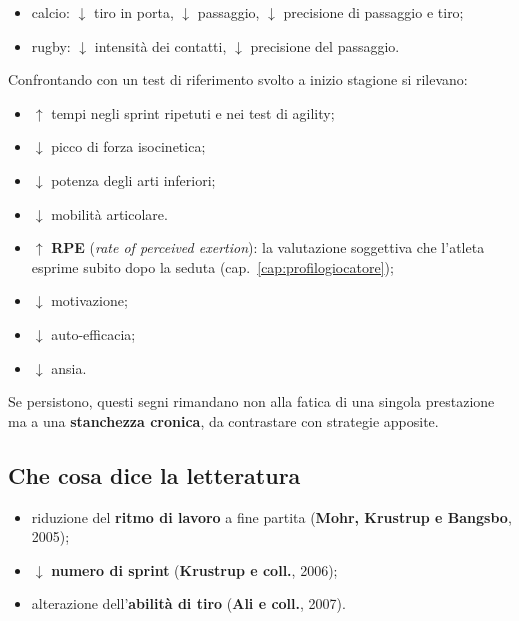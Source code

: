 \begin{itemize}
  \item calcio: $\downarrow$ tiro in porta, $\downarrow$ passaggio, $\downarrow$ precisione di
    passaggio e tiro;
  \item rugby: $\downarrow$ intensità dei contatti, $\downarrow$ precisione del passaggio.
\end{itemize}

Confrontando con un test di riferimento svolto a inizio stagione si rilevano:
\begin{itemize}
  \item $\uparrow$ tempi negli sprint ripetuti e nei test di agility;
  \item $\downarrow$ picco di forza isocinetica;
  \item $\downarrow$ potenza degli arti inferiori;
  \item $\downarrow$ mobilità articolare.
\end{itemize}

\begin{itemize}
  \item $\uparrow$ \textbf{RPE} (\textit{rate of perceived exertion}): la valutazione soggettiva
    che l'atleta esprime subito dopo la seduta (cap.~\ref{cap:profilogiocatore});
  \item $\downarrow$ motivazione;
  \item $\downarrow$ auto-efficacia;
  \item $\downarrow$ ansia.
\end{itemize}
Se persistono, questi segni rimandano non alla fatica di una singola prestazione ma a una
\textbf{stanchezza cronica}, da contrastare con strategie apposite.

\subsection{Che cosa dice la letteratura}

\begin{itemize}
  \item riduzione del \textbf{ritmo di lavoro} a fine partita (\textbf{Mohr, Krustrup e Bangsbo},
    2005);
  \item $\downarrow$ \textbf{numero di sprint} (\textbf{Krustrup e coll.}, 2006);
  \item alterazione dell'\textbf{abilità di tiro} (\textbf{Ali e coll.}, 2007).
\end{itemize}


